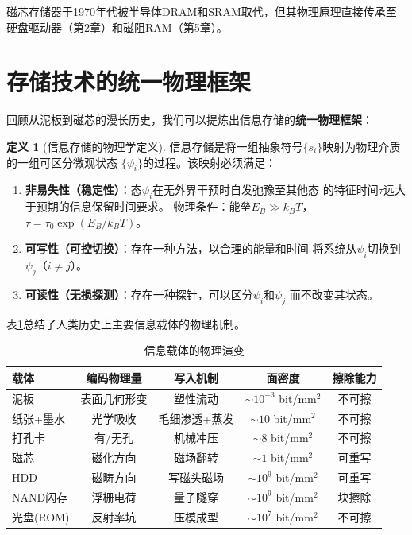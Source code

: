 \documentclass[11pt,a4paper,openany]{book}
\theoremstyle{definition}
\newtheorem{definition}{定义}[chapter]
\theoremstyle{plain}
\theoremstyle{remark}
\begin{document}
磁芯存储器于1970年代被半导体DRAM和SRAM取代，但其物理原理直接传承至
硬盘驱动器（第2章）和磁阻RAM（第5章）。

\section{存储技术的统一物理框架}

回顾从泥板到磁芯的漫长历史，我们可以提炼出信息存储的\textbf{统一物理框架}：

\begin{definition}[信息存储的物理学定义]
信息存储是将一组抽象符号$\{s_i\}$映射为物理介质的一组可区分微观状态
$\{\psi_i\}$的过程。该映射必须满足：
\begin{enumerate}
  \item \textbf{非易失性（稳定性）}：态$\psi_i$在无外界干预时自发弛豫至其他态
  的特征时间$\tau$远大于预期的信息保留时间要求。
  物理条件：能垒$E_B \gg k_B T$，$\tau = \tau_0\exp(E_B/k_B T)$。
  \item \textbf{可写性（可控切换）}：存在一种方法，以合理的能量和时间
  将系统从$\psi_i$切换到$\psi_j$（$i \neq j$）。
  \item \textbf{可读性（无损探测）}：存在一种探针，可以区分$\psi_i$和$\psi_j$
  而不改变其状态。
\end{enumerate}
\end{definition}

表\ref{tab:carrier-history}总结了人类历史上主要信息载体的物理机制。

\begin{table}[H]
\centering
\caption{信息载体的物理演变}
\begin{tabular}{@{}lcccc@{}}
\toprule
载体 & 编码物理量 & 写入机制 & 面密度 & 擦除能力 \\
\midrule
泥板 & 表面几何形变 & 塑性流动 & $\sim 10^{-3}$ bit/mm$^2$ & 不可擦 \\
纸张+墨水 & 光学吸收 & 毛细渗透+蒸发 & $\sim 10$ bit/mm$^2$ & 不可擦 \\
打孔卡 & 有/无孔 & 机械冲压 & $\sim 8$ bit/mm$^2$ & 不可擦 \\
磁芯 & 磁化方向 & 磁场翻转 & $\sim 1$ bit/mm$^2$ & 可重写 \\
HDD & 磁畴方向 & 写磁头磁场 & $\sim 10^9$ bit/mm$^2$ & 可重写 \\
NAND闪存 & 浮栅电荷 & 量子隧穿 & $\sim 10^9$ bit/mm$^2$ & 块擦除 \\
光盘(ROM) & 反射率坑 & 压模成型 & $\sim 10^7$ bit/mm$^2$ & 不可擦 \\
\bottomrule
\end{tabular}
\label{tab:carrier-history}
\end{table}
\end{document}
